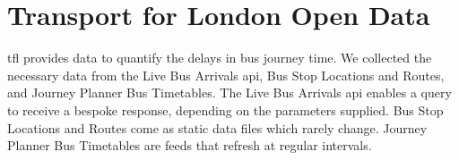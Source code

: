\section{Transport for London Open Data}
\acrshort{tfl} provides data to quantify the delays in bus journey time. We collected the necessary data from the Live Bus Arrivals \acrshort{api}, Bus Stop Locations and Routes, and Journey Planner Bus Timetables. The Live Bus Arrivals \acrshort{api} enables a query to receive a bespoke response, depending on the parameters supplied. Bus Stop Locations and Routes come as static data files which rarely change. Journey Planner Bus Timetables are feeds that refresh at regular intervals.
